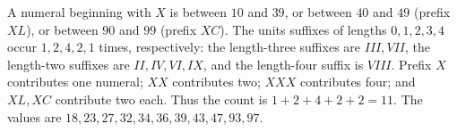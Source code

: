 A numeral beginning with $X$ is between $10$ and $39$, or between $40$ and $49$ (prefix $XL$), or between $90$ and $99$ (prefix $XC$). The units suffixes of lengths $0,1,2,3,4$ occur $1,2,4,2,1$ times, respectively: the length-three suffixes are $III,VII$, the length-two suffixes are $II,IV,VI,IX$, and the length-four suffix is $VIII$. Prefix $X$ contributes one numeral; $XX$ contributes two; $XXX$ contributes four; and $XL,XC$ contribute two each. Thus the count is $1+2+4+2+2=\boxed{11}$. The values are $18,23,27,32,34,36,39,43,47,93,97$.
